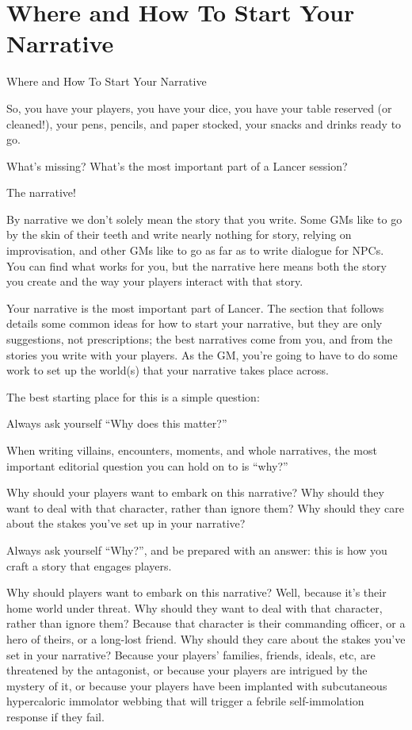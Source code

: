 \section{Where and How To Start Your Narrative}

                          Where and How To Start Your Narrative

So, you have your players, you have your dice, you have your table reserved (or cleaned!), your
pens, pencils, and paper stocked, your snacks and drinks ready to go.


What’s missing? What’s the most important part of a Lancer session?


The narrative!





By narrative we don’t solely mean the story that you write. Some GMs like to go by the skin of
their teeth and write nearly nothing for story, relying on improvisation, and other GMs like to go
as far as to write dialogue for NPCs. You can find what works for you, but the narrative here
means both the story you create and the way your players interact with that story.


Your narrative is the most important part of Lancer. The section that follows details some
common ideas for how to start your narrative, but they are only suggestions, not prescriptions;
the best narratives come from you, and from the stories you write with your players. As the GM,
you’re going to have to do some work to set up the world(s) that your narrative takes place
across.


The best starting place for this is a simple question:


Always ask yourself  “Why does this matter?”

When writing villains, encounters, moments, and whole narratives, the most important editorial
question you can hold on to is “why?”


Why should your players want to embark on this narrative? Why should they want to deal with
that character, rather than ignore them? Why should they care about the stakes you’ve set up in
your narrative?


Always ask yourself “Why?”, and be prepared with an answer: this is how you craft a story that
engages players.


Why should players want to embark on this narrative? Well, because it’s their home world under
threat. Why should they want to deal with that character, rather than ignore them? Because that
character is their commanding officer, or a hero of theirs, or a long-lost friend. Why should they
care about the stakes you’ve set in your narrative? Because your players’ families, friends,
ideals, etc, are threatened by the antagonist, or because your players are intrigued by the
mystery of it, or because your players have been implanted with subcutaneous hypercaloric
immolator webbing that will trigger a febrile self-immolation response if they fail.


